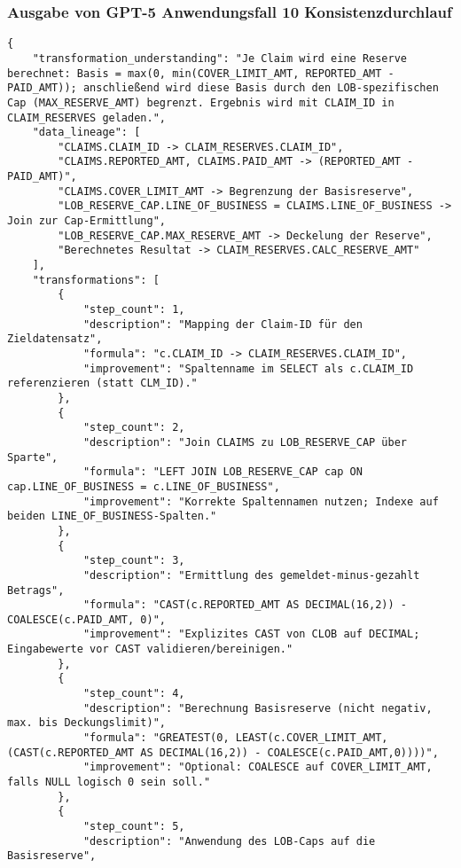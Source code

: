 \subsubsection{Ausgabe von GPT-5 Anwendungsfall 10 Konsistenzdurchlauf}\label{anhang:subsubsec:gpt_case10_prompt2}
\begin{lstlisting}[caption={Ausgabe: GPT-5 Anwendungsfall 10 Konsistenzdurchlauf},label={gpt_case10_prompt2}]
{
    "transformation_understanding": "Je Claim wird eine Reserve berechnet: Basis = max(0, min(COVER_LIMIT_AMT, REPORTED_AMT - PAID_AMT)); anschließend wird diese Basis durch den LOB-spezifischen Cap (MAX_RESERVE_AMT) begrenzt. Ergebnis wird mit CLAIM_ID in CLAIM_RESERVES geladen.",
    "data_lineage": [
        "CLAIMS.CLAIM_ID -> CLAIM_RESERVES.CLAIM_ID",
        "CLAIMS.REPORTED_AMT, CLAIMS.PAID_AMT -> (REPORTED_AMT - PAID_AMT)",
        "CLAIMS.COVER_LIMIT_AMT -> Begrenzung der Basisreserve",
        "LOB_RESERVE_CAP.LINE_OF_BUSINESS = CLAIMS.LINE_OF_BUSINESS -> Join zur Cap-Ermittlung",
        "LOB_RESERVE_CAP.MAX_RESERVE_AMT -> Deckelung der Reserve",
        "Berechnetes Resultat -> CLAIM_RESERVES.CALC_RESERVE_AMT"
    ],
    "transformations": [
        {
            "step_count": 1,
            "description": "Mapping der Claim-ID für den Zieldatensatz",
            "formula": "c.CLAIM_ID -> CLAIM_RESERVES.CLAIM_ID",
            "improvement": "Spaltenname im SELECT als c.CLAIM_ID referenzieren (statt CLM_ID)."
        },
        {
            "step_count": 2,
            "description": "Join CLAIMS zu LOB_RESERVE_CAP über Sparte",
            "formula": "LEFT JOIN LOB_RESERVE_CAP cap ON cap.LINE_OF_BUSINESS = c.LINE_OF_BUSINESS",
            "improvement": "Korrekte Spaltennamen nutzen; Indexe auf beiden LINE_OF_BUSINESS-Spalten."
        },
        {
            "step_count": 3,
            "description": "Ermittlung des gemeldet-minus-gezahlt Betrags",
            "formula": "CAST(c.REPORTED_AMT AS DECIMAL(16,2)) - COALESCE(c.PAID_AMT, 0)",
            "improvement": "Explizites CAST von CLOB auf DECIMAL; Eingabewerte vor CAST validieren/bereinigen."
        },
        {
            "step_count": 4,
            "description": "Berechnung Basisreserve (nicht negativ, max. bis Deckungslimit)",
            "formula": "GREATEST(0, LEAST(c.COVER_LIMIT_AMT, (CAST(c.REPORTED_AMT AS DECIMAL(16,2)) - COALESCE(c.PAID_AMT,0))))",
            "improvement": "Optional: COALESCE auf COVER_LIMIT_AMT, falls NULL logisch 0 sein soll."
        },
        {
            "step_count": 5,
            "description": "Anwendung des LOB-Caps auf die Basisreserve",

\end{lstlisting}
